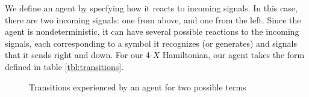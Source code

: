 \documentclass[12pt]{amsbook}
\theoremstyle{plain}
\theoremstyle{definition}
\theoremstyle{remark}
\begin{document}
We define an agent by specfying how it reacts to incoming signals.  In this case, there are two incoming signals:  one from above, and one from the left.  Since the agent is nondeterministic, it can have several possible reactions to the incoming signals, each corresponding to a symbol it recognizes (or generates) and signals that it sends right and down.  For our 4-$X$ Hamiltonian, our agent takes the form defined in table \ref{tbl:transitions}.

\begin{figure}
\caption{Transitions experienced by an agent for two possible terms}
\end{figure}
\end{document}
